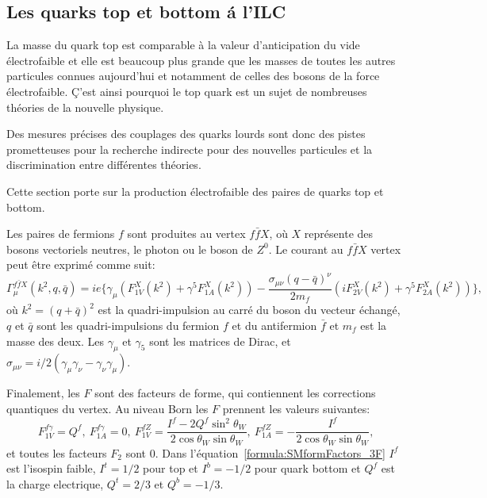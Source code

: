 \subsection*{Les quarks top et bottom \'a l'ILC}

La masse du quark top est comparable à la valeur d'anticipation du vide électrofaible et elle est beaucoup plus grande que les masses de toutes les autres particules connues aujourd'hui et notamment de celles des bosons de la force électrofaible.
\c C'est ainsi pourquoi le top quark est un sujet de nombreuses théories de la nouvelle physique.

Des mesures précises des couplages des quarks lourds sont donc des pistes prometteuses pour la recherche indirecte pour des nouvelles particules et la discrimination entre différentes théories.

Cette section porte sur la production électrofaible des paires de quarks top et bottom.

Les paires de fermions $f$ sont produites au vertex $f\bar{f}X$, où $X$ représente des bosons vectoriels neutres, le photon ou le boson de $Z^0$. Le courant au $f\bar{f}X$ vertex peut être exprimé comme suit:
\begin{equation}
\Gamma^{f\bar{f}X}_\mu (k^2,q,\bar{q}) = ie\{ \gamma_\mu (F^X_{1V}(k^2) + \gamma^5 F^X_{1A}(k^2)) - \frac{\sigma_{\mu\nu}(q-\bar{q})^\nu}{2m_f}(iF^X_{2V}(k^2) + \gamma^5 F^X_{2A}(k^2)) \},
\end{equation}
où $k^2= (q+\bar{q})^2$ est la quadri-impulsion au carré du boson du vecteur échangé, $q$ et $\bar{q} $ sont les quadri-impulsions du fermion $f$ et du antifermion $\bar{f}$ et $m_f$ est la masse des deux. Les $\gamma_\mu$ et $\gamma_5$ sont les matrices de Dirac, et $\sigma_{\mu\nu} = i/2(\gamma_\mu\gamma_\nu - \gamma_\nu\gamma_\mu)$.

Finalement, les $F$ sont des facteurs de forme, qui contiennent les corrections quantiques du vertex. Au niveau Born les $F$ prennent les valeurs suivantes:  
\begin{equation}
F^{f\gamma}_{1V} = Q^{f}, \ F^{f\gamma}_{1A} = 0, \ F^{fZ}_{1V} = \frac{I^f - 2Q^f\sin^2\theta_W}{2\cos\theta_W\sin\theta_W}, \ F^{fZ}_{1A} = - \frac{I^f}{2\cos\theta_W\sin\theta_W},
\label{formula:SMformFactors_3F}
\end{equation}
et toutes les facteurs $F_2$ sont 0. Dans l'équation~\ref{formula:SMformFactors_3F} $I^f$ est  l'isospin faible, $I^t = 1/2$ pour top et $I^b = -1/2$ pour quark bottom  et $Q^f$ est la charge electrique, $Q^t = 2/3$ et $Q^b = -1/3$.


